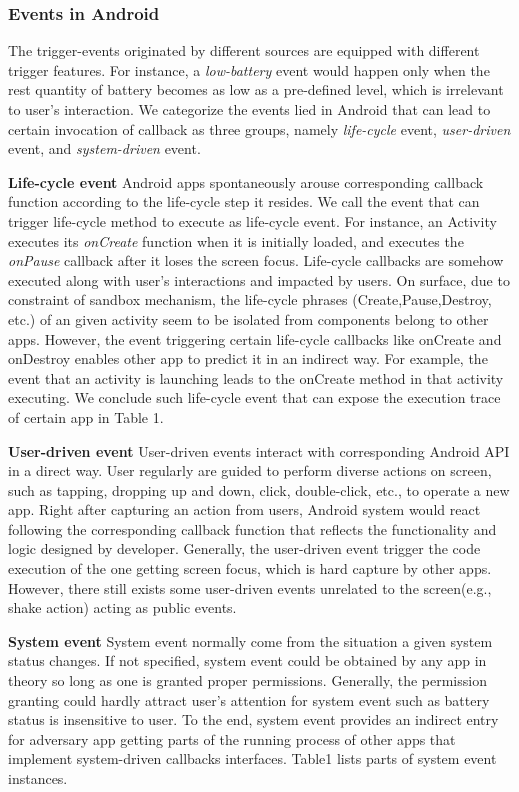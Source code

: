\documentclass{sig-alternate-05-2015}
\begin{document}
\subsubsection{Events in Android}
The trigger-events originated by different sources are equipped with different trigger features. For instance, a \textit{low-battery} event would happen only when the rest quantity of battery becomes as low as a pre-defined level, which is irrelevant to user's interaction. We categorize the events lied in Android that can lead to certain invocation of callback as three groups, namely \textit{life-cycle} event, \textit{user-driven} event, and \textit{system-driven} event.

\textbf{Life-cycle event} Android apps spontaneously arouse corresponding callback function according to the life-cycle step it resides. We call the event that can trigger life-cycle method to execute as life-cycle event. For instance, an Activity executes its \textit{onCreate} function when it is initially loaded, and executes the \textit{onPause} callback after it loses the screen focus. Life-cycle callbacks are somehow executed along with user's interactions and impacted by users. On surface, due to constraint of sandbox mechanism, the life-cycle phrases (Create,Pause,Destroy, etc.) of an given activity seem to be isolated from components belong to other apps. However, the event triggering certain life-cycle callbacks like onCreate and onDestroy enables other app to predict it in an indirect way. For example, the event that an activity is launching leads to the onCreate method in that activity executing. We conclude such life-cycle event that can expose the execution trace of certain app in Table 1.

\textbf{User-driven event} User-driven events interact with corresponding Android API in a direct way. User regularly are guided to perform diverse actions on screen, such as tapping, dropping up and down, click, double-click, etc., to operate a new app. Right after capturing an action from users, Android system would react following the  corresponding callback function that reflects the functionality and logic designed by developer. Generally, the user-driven event trigger the code execution of the one getting screen focus, which is hard capture by other apps. However, there still exists some user-driven events unrelated to the screen(e.g., shake action) acting as public events. 

\textbf{System event} System event normally come from the situation a given system status changes. If not specified, system event could be obtained by any app in theory so long as one is granted proper permissions. Generally, the permission granting could hardly attract user's attention for system event such as battery status is insensitive to user. To the end, system event provides an indirect entry for adversary app getting parts of the running process of other apps that implement system-driven callbacks interfaces. Table1 lists parts of system event instances.
\end{document}
